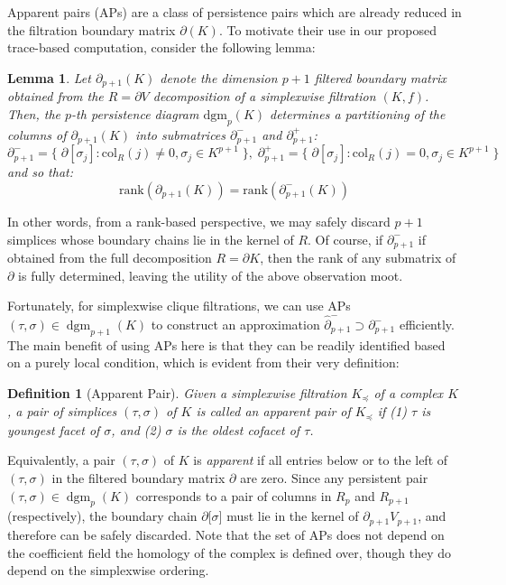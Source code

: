 \documentclass[pdflatex,sn-mathphys-num]{sn-jnl}
\newtheorem{lemma}{Lemma}
\newtheorem{definition}{Definition}
\begin{document}
Apparent pairs (APs) are a class of persistence pairs which are already reduced in the filtration boundary matrix \(\partial(K)\). To motivate their use in our proposed trace-based computation, consider the following lemma:

\begin{lemma}\label{lemma:ap_kernel}
Let $\partial_{p + 1} (K)$ denote the dimension $p + 1$ filtered boundary matrix obtained from the $R = \partial V$ decomposition of a simplexwise filtration $(K , f)$. Then, the $p$-th persistence diagram $\mathrm{dgm}_p (K)$ determines a partitioning of the columns of $\partial_{p + 1} (K)$ into submatrices $\partial_{p + 1}^-$ and $\partial_{p + 1}^+$: 
	$$ \partial_{p + 1}^- = \{ \; \partial [\sigma_j] : \mathrm{col}_R (j) \neq 0, \sigma_j \in K^{p + 1} \; \}, 
		 \; 
		 \partial_{p + 1}^+ = \{ \; \partial [\sigma_j] : \mathrm{col}_R (j) = 0 , \sigma_j \in K^{p + 1} \; \} $$
	and so that: 
	$$ \mathrm{rank}(\partial_{p + 1} (K)) = \mathrm{rank}(\partial_{p + 1}^- (K)) $$
\end{lemma}
\noindent In other words, from a rank-based perspective, we may safely discard \(p + 1\) simplices whose boundary chains lie in the kernel of \(R\). Of course, if \(\partial_{p + 1}^{-}\) if obtained from the full decomposition \(R = \partial K\), then the rank of any submatrix of \(\partial\) is fully determined, leaving the utility of the above observation moot.

Fortunately, for simplexwise clique filtrations, we can use APs \((\tau,\sigma) \in \operatorname{dgm}_{p + 1}(K)\) to construct an approximation \({\hat{\partial}}_{p + 1}^{-} \supset \partial_{p + 1}^{-}\) efficiently. The main benefit of using APs here is that they can be readily identified based on a purely local condition, which is evident from their very definition:
\begin{definition}[Apparent Pair]\label{def:apparent_pair}
Given a simplexwise filtration $K_\preceq$ of a complex $K$, a pair of simplices $(\tau , \sigma)$ of $K$ is called an \emph{apparent pair} of $K_\preceq$ if (1) $\tau$ is youngest facet of $\sigma$, and (2) $\sigma$ is the oldest cofacet of $\tau$.
\end{definition}
\noindent Equivalently, a pair \((\tau,\sigma)\) of \(K\) is \emph{apparent} if all entries below or to the left of \((\tau,\sigma)\) in the filtered boundary matrix \(\partial\) are zero. Since any persistent pair \((\tau,\sigma) \in \operatorname{dgm}_{p}(K)\) corresponds to a pair of columns in \(R_{p}\) and \(R_{p + 1}\) (respectively), the boundary chain \(\partial\left. \lbrack\sigma\rbrack \right.\) must lie in the kernel of \(\partial_{p + 1}V_{p + 1}\), and therefore can be safely discarded. Note that the set of APs does not depend on the coefficient field the homology of the complex is defined over, though they do depend on the simplexwise ordering.
\end{document}
